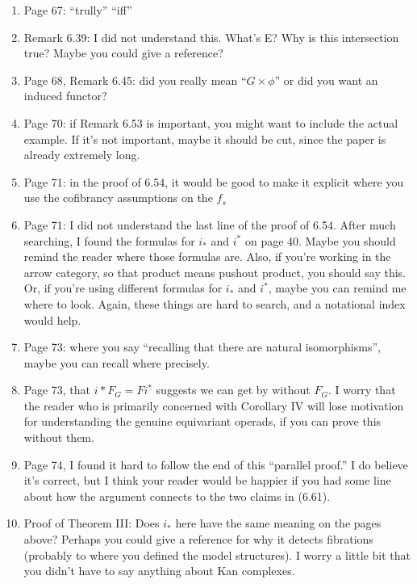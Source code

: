 \documentclass{article}
\begin{document}
\begin{enumerate}
\item
Page 67: ``trully''
``iff''

\item
Remark 6.39: I did not understand this. What's E? Why is this intersection true? Maybe you could give a reference?

\item
Page 68, Remark 6.45: did you really mean ``$G \times \phi$'' or did you want an induced functor?

\item
Page 70: if Remark 6.53 is important, you might want to include the actual example. If it's not important, maybe it should be cut, since the paper is already extremely long.

\item
Page 71: in the proof of 6.54, it would be good to make it explicit where you use the cofibrancy assumptions on the $f_s$

\item
Page 71: I did not understand the last line of the proof of 6.54. After much searching, I found the formulas for $i_*$ and $i^*$ on page 40. Maybe you should remind the reader where those formulas are. Also, if you're working in the arrow category, so that product means pushout product, you should say this. Or, if you're using different formulas for $i_*$ and $i^*$, maybe you can remind me where to look. Again, these things are hard to search, and a notational index would help.

\item
Page 73: where you say ``recalling that there are natural isomorphisms'', maybe you can recall where precisely.

\item
Page 73, that $i* F_G = F i^*$ suggests we can get by without $F_G$. I worry that the reader who is primarily concerned with Corollary IV will lose motivation for understanding the genuine equivariant operads, if you can prove this without them.

\item
Page 74, I found it hard to follow the end of this ``parallel proof.'' I do believe it's correct, but I think your reader would be happier if you had some line about how the argument connects to the two claims in (6.61).

\item
Proof of Theorem III: Does $i_*$ here have the same meaning on the pages above? Perhaps you could give a reference for why it detects fibrations (probably to where you defined the model structures). I worry a little bit that you didn't have to say anything about Kan complexes.


\end{enumerate}
\end{document}
